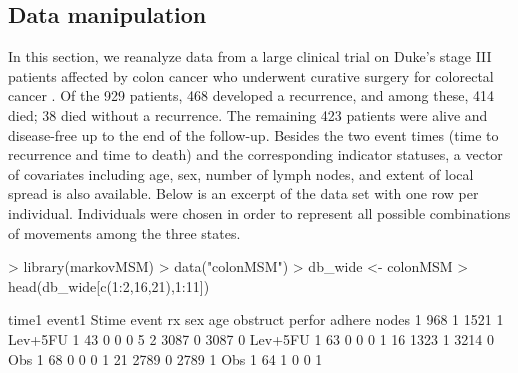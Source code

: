 \subsection{Data manipulation} \label{sec:conc}

In this section, we reanalyze data from a large clinical trial on Duke's stage III patients affected by colon cancer who underwent curative surgery for colorectal cancer \citep{Moertel1990}. Of the 929 patients, 468 developed a recurrence, and among these, 414 died; 38 died without a recurrence. The remaining 423 patients were alive and disease-free up to the end of the follow-up. Besides the two event times (time to recurrence and time to death) and the corresponding indicator statuses, a vector of covariates including age, sex, number of lymph nodes, and extent of local spread is also available. Below is an excerpt of the data set with one row per individual. Individuals were chosen in order to represent all possible combinations of movements among the three states.

\begin{example}
> library(markovMSM)
> data("colonMSM")
> db_wide <- colonMSM
> head(db_wide[c(1:2,16,21),1:11])

   time1 event1 Stime event      rx sex age obstruct perfor adhere nodes
1    968      1  1521     1 Lev+5FU   1  43        0      0      0     5
2   3087      0  3087     0 Lev+5FU   1  63        0      0      0     1
16  1323      1  3214     0     Obs   1  68        0      0      0     1
21  2789      0  2789     1     Obs   1  64        1      0      0     1
\end{example}


